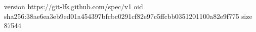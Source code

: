 version https://git-lfs.github.com/spec/v1
oid sha256:38ae6ea3eb9ed01a454397bfcbc0291cf82e97c5ffcbb0351201100a82e9f775
size 87544
